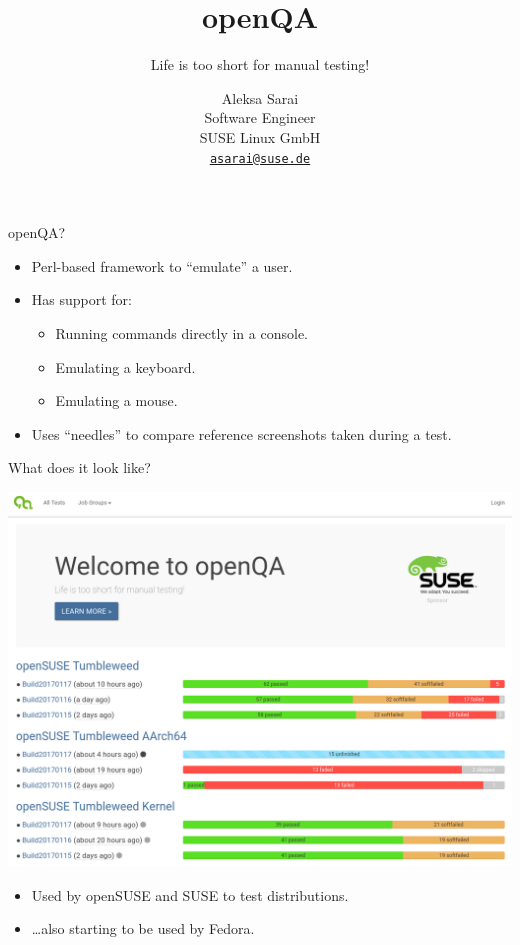 \documentclass[10pt,aspectratio=169]{beamer}
\title{openQA}
\subtitle{Life is too short for manual testing!}
\author{%
		Aleksa Sarai \\
		Software Engineer \\
		SUSE Linux GmbH \\
		\href{mailto:asarai@suse.de}{\tiny\tt \underline{asarai@suse.de}}}
\date{}
\institute{}
\begin{document}
	\maketitle

	\begin{frame}{openQA?}
		\begin{itemize}
			\item Perl-based framework to ``emulate'' a user.
			\item Has support for:
			\begin{itemize}
				\item Running commands directly in a console.
				\item Emulating a keyboard.
				\item Emulating a mouse.
			\end{itemize}
			\item Uses ``needles'' to compare reference screenshots taken during a test.
		\end{itemize}
	\end{frame}

	\begin{frame}{What does it look like?}
		\begin{center}
			\includegraphics[height=0.7\textheight]{openqa_intro}
		\end{center}
		\begin{itemize}
			\item Used by openSUSE and SUSE to test distributions.
			\item \dots also starting to be used by Fedora.
		\end{itemize}
	\end{frame}
\end{document}

